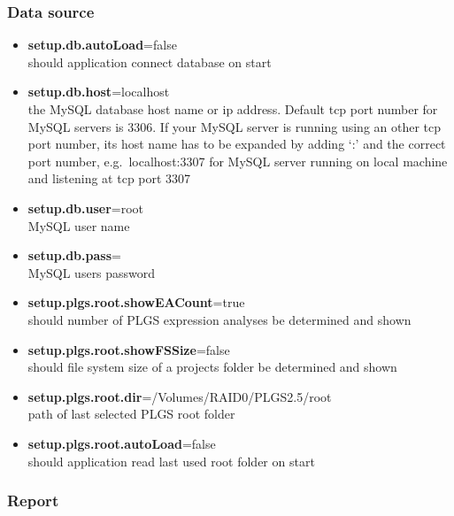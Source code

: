 \documentclass[]{article}
\providecommand{\tightlist}{%
  \setlength{\itemsep}{0pt}\setlength{\parskip}{0pt}}
\begin{document}
\subsubsection{Data source}\label{data-source}

\begin{itemize}
\tightlist
\item
  \textbf{setup.db.autoLoad}=false\\
  should application connect database on start
\item
  \textbf{setup.db.host}=localhost\\
  the MySQL database host name or ip address. Default tcp port number
  for MySQL servers is 3306. If your MySQL server is running using an
  other tcp port number, its host name has to be expanded by adding `:'
  and the correct port number, e.g.~localhost:3307 for MySQL server
  running on local machine and listening at tcp port 3307
\item
  \textbf{setup.db.user}=root\\
  MySQL user name
\item
  \textbf{setup.db.pass}=\\
  MySQL users password
\item
  \textbf{setup.plgs.root.showEACount}=true\\
  should number of PLGS expression analyses be determined and shown
\item
  \textbf{setup.plgs.root.showFSSize}=false\\
  should file system size of a projects folder be determined and shown
\item
  \textbf{setup.plgs.root.dir}=/Volumes/RAID0/PLGS2.5/root\\
  path of last selected PLGS root folder
\item
  \textbf{setup.plgs.root.autoLoad}=false\\
  should application read last used root folder on start
\end{itemize}

\subsubsection{Report}\label{report}
\end{document}
